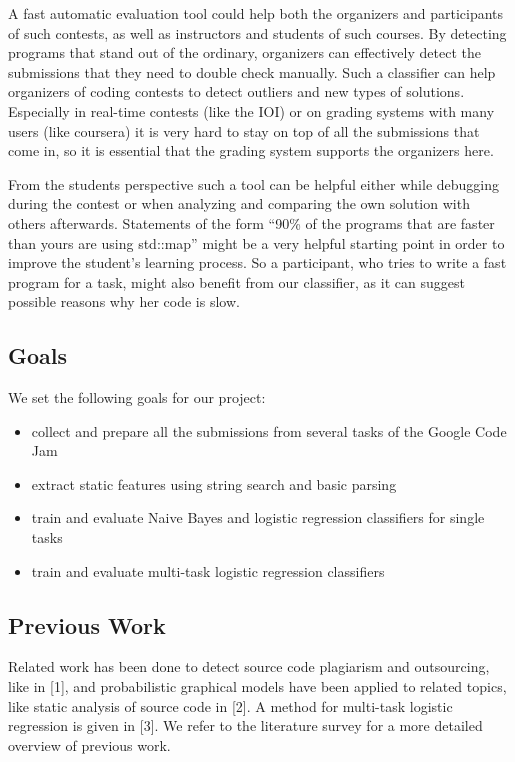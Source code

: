 A fast automatic evaluation tool could help both the organizers and participants of such contests, as well as instructors and students of such courses.
By detecting programs that stand out of the ordinary, organizers can effectively detect the submissions that they need to double check manually.
Such a classifier can help organizers of coding contests to detect outliers and new types of solutions. 
Especially in real-time contests (like the IOI) or on grading systems with many users (like coursera) it is very hard to stay on top of all the submissions that come in, so it is essential that the grading system supports the organizers here.

From the students perspective such a tool can be helpful either while debugging during the contest or when analyzing and comparing the own solution with others afterwards. Statements of the form ``90\% of the programs that are faster than yours are using std::map'' might be a very helpful starting point in order to improve the student's learning process. So a participant, who tries to write a fast program for a task, might also benefit from our classifier, as it can suggest possible reasons why her code is slow.

\subsection*{Goals}
We set the following goals for our project:
\begin{itemize}
\item collect and prepare all the submissions from several tasks of the Google Code Jam
\item extract static features using string search and basic parsing
\item train and evaluate Naive Bayes and logistic regression classifiers for single tasks
\item train and evaluate multi-task logistic regression classifiers
\end{itemize}

\subsection*{Previous Work}
Related work has been done to detect source code plagiarism and outsourcing, like in [1], and probabilistic graphical models have been applied to related topics, like static analysis of source code in [2]. 
A method for multi-task logistic regression is given in [3].
We refer to the literature survey for a more detailed overview of previous work.
